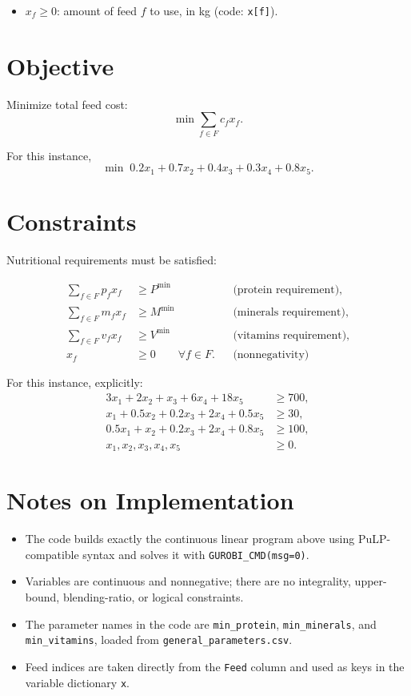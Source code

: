 \begin{itemize}
    \item $x_f \ge 0$: amount of feed $f$ to use, in kg (code: \texttt{x[f]}).
\end{itemize}

\section*{Objective}

Minimize total feed cost:
\[
\min \sum_{f \in F} c_f x_f.
\]

For this instance,
\[
\min \; 0.2x_1 + 0.7x_2 + 0.4x_3 + 0.3x_4 + 0.8x_5.
\]

\section*{Constraints}

Nutritional requirements must be satisfied:

\begin{align*}
\sum_{f \in F} p_f x_f &\ge P^{\min} &&\text{(protein requirement)},\\
\sum_{f \in F} m_f x_f &\ge M^{\min} &&\text{(minerals requirement)},\\
\sum_{f \in F} v_f x_f &\ge V^{\min} &&\text{(vitamins requirement)},\\
x_f &\ge 0 \qquad \forall f \in F. &&\text{(nonnegativity)}
\end{align*}

For this instance, explicitly:
\begin{align*}
3x_1 + 2x_2 + x_3 + 6x_4 + 18x_5 &\ge 700,\\
x_1 + 0.5x_2 + 0.2x_3 + 2x_4 + 0.5x_5 &\ge 30,\\
0.5x_1 + x_2 + 0.2x_3 + 2x_4 + 0.8x_5 &\ge 100,\\
x_1,x_2,x_3,x_4,x_5 &\ge 0.
\end{align*}

\section*{Notes on Implementation}

\begin{itemize}
    \item The code builds exactly the continuous linear program above using PuLP-compatible syntax and solves it with \texttt{GUROBI\_CMD(msg=0)}.
    \item Variables are continuous and nonnegative; there are no integrality, upper-bound, blending-ratio, or logical constraints.
    \item The parameter names in the code are \texttt{min\_protein}, \texttt{min\_minerals}, and \texttt{min\_vitamins}, loaded from \texttt{general\_parameters.csv}.
    \item Feed indices are taken directly from the \texttt{Feed} column and used as keys in the variable dictionary \texttt{x}.
\end{itemize}
